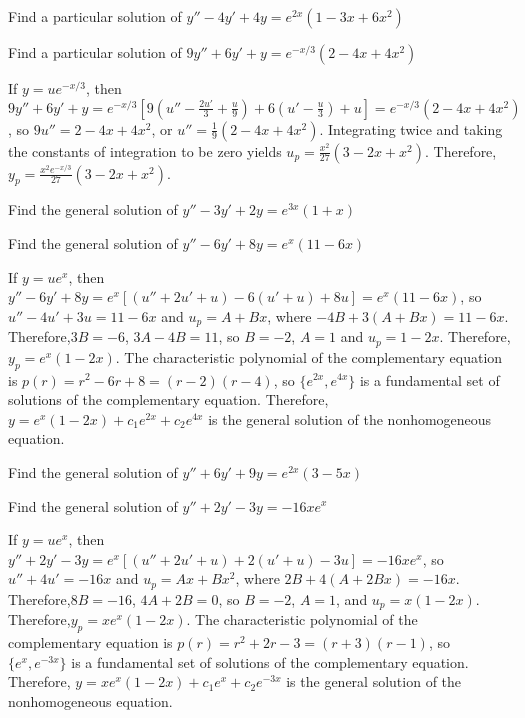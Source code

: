 \documentclass{ximera}
\begin{document}
\begin{problem}\label{exer:5.4.13} Find a particular
solution of $y''-4y'+4y=e^{2x}(1-3x+6x^2)$
\end{problem}

\begin{problem}\label{exer:5.4.14} Find a particular
solution of $9y''+6y'+y=e^{-x/3}(2-4x+4x^2)$
\begin{solution}
If $y=ue^{-x/3}$, then
$9y''+6y'+y=e^{-x/3}\left[9\left(u''-\frac{2u'}{3}+\frac{u}{9}\right)
+6\left(u'-\frac{u}{3}\right)+u\right]= e^{-x/3}(2-4x+4x^2)$, so
$9u''=2-4x+4x^2$, or $u''=\frac{1}{9}(2-4x+4x^2)$. Integrating twice
and taking the constants of integration to be zero yields
$u_p=\frac{x^2}{27}(3-2x+x^2)$. Therefore,
$y_p=\frac{x^2e^{-x/3}}{27}(3-2x+x^2)$.
\end{solution}
\end{problem}

\begin{problem}\label{exer:5.4.15} Find the general
solution of $y''-3y'+2y=e^{3x}(1+x)$ 
\end{problem}

\begin{problem}\label{exer:5.4.16} Find the general
solution of $y''-6y'+8y=e^x(11-6x)$
\begin{solution}
If $y=ue^x$, then $y''-6y'+8y=e^x\left[(u''+2u'+u)-6(u'+u)+8u\right]=
e^x(11-6x)$, so $u''-4u'+3u =11-6x$ and $u_p=A+Bx$, where
$-4B+3(A+Bx)=11-6x$. Therefore,$3B=-6$, $3A-4B=11$, so $B=-2$, $A=1$
and $u_p=1-2x$. Therefore,$y_p=e^x(1-2x)$. The characteristic
polynomial of the complementary equation is
$p(r)=r^2-6r+8=(r-2)(r-4)$, so $\{e^{2x},e^{4x}\}$ is a fundamental
set of solutions of the complementary equation. Therefore,
$y=e^x(1-2x)+c_1e^{2x}+c_2e^{4x}$ is the general solution of the
nonhomogeneous equation.
\end{solution}
\end{problem}

\begin{problem}\label{exer:5.4.17} Find the general
solution of $ y''+6y'+9y=e^{2x}(3-5x)$ 
\end{problem}

\begin{problem}\label{exer:5.4.18} Find the general
solution of $y''+2y'-3y=-16xe^x$
\begin{solution}
If $y=ue^x$, then $y''+2y'-3y=e^x\left[(u''+2u'+u)+2(u'+u)-3u\right]=
-16xe^x$, so $u''+4u'=-16x$ and $u_p=Ax+Bx^2$, where
$2B+4(A+2Bx)=-16x$. Therefore,$8B=-16$, $4A+2B=0$, so $B=-2$, $A=1$,
and $u_p=x(1-2x)$. Therefore,$y_p=xe^x(1-2x)$. The characteristic
polynomial of the complementary equation is
$p(r)=r^2+2r-3=(r+3)(r-1)$, so $\{e^x,e^{-3x}\}$ is a fundamental set
of solutions of the complementary equation. Therefore,
$y=xe^x(1-2x)+c_1e^x+c_2e^{-3x}$ is the general solution of the
nonhomogeneous equation.
\end{solution}
\end{problem}
\end{document}
